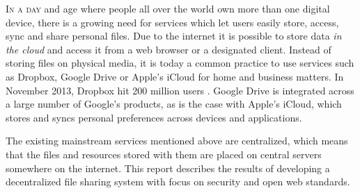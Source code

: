 \lettrine[lines=3]{I}{n a day} and age where people all over the world own more than one digital device, there is a growing need for services which let users easily store, access, sync and share personal files. Due to the internet it is possible to store data \emph{in the cloud} and access it from a web browser or a designated client. Instead of storing files on physical media, it is today a common practice to use services such as Dropbox, Google Drive or Apple's iCloud for home and business matters. In November 2013, Dropbox hit 200 million users \cite{Constine:2013:Online}. Google Drive is integrated across a large number of Google's products, as is the case with Apple's iCloud, which stores and syncs personal preferences across devices and applications.

The existing mainstream services mentioned above are centralized, which means that the files and resources stored with them are placed on central servers somewhere on the internet. This report describes the results of developing a decentralized file sharing system with focus on security and open web standards.






